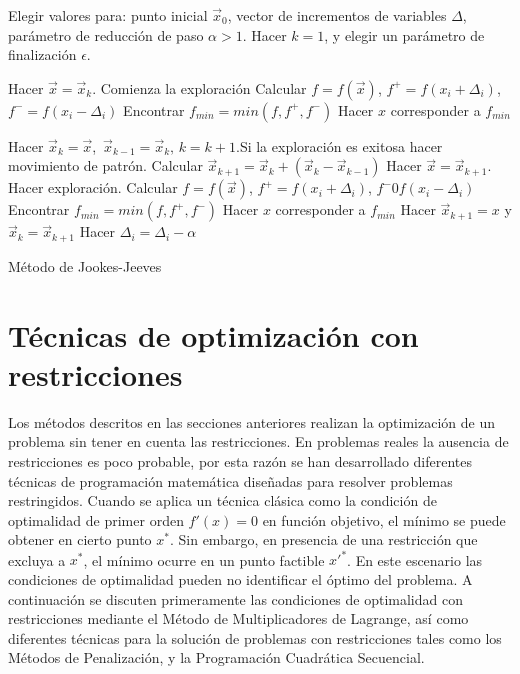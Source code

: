 \begin{algorithm}
	\begin{algorithmic}[1]
		\STATE Elegir valores para: punto inicial $\vec{x}_0$, vector de incrementos de variables $\Delta$, parámetro de reducción de paso   $\alpha>1$. Hacer $k=1$, y elegir un parámetro de finalización $\epsilon$. 
        
		\WHILE {$  \epsilon <|| \Delta||$}
		\STATE Hacer $\vec{x}=\vec{x}_k$. Comienza la exploración
         \STATE Calcular $f=f(\vec{x})$, $f^+=f(x_i+ \Delta_i)$, $f^- =f(x_i- \Delta_i)$
         \STATE Encontrar $f_{min}= min(f,f^+,f^-)$
         \STATE Hacer $x$ corresponder a $f_{min}$
          \ENDFOR
          
          \STATE Hacer $\vec{x}_k=\vec{x}$,\, $\vec{x}_{k-1}=\vec{x}_k,\, k=k+1 $.Si la exploración es exitosa hacer movimiento de patrón.
          \STATE Calcular $\vec{x}_{k+1}=\vec{x}_{k}+(\vec{x}_{k}-\vec{x}_{k-1})$
           \STATE Hacer $\vec{x}=\vec{x}_{k+1}$. Hacer exploración.
            	 \STATE Calcular $f=f(\vec{x})$, $f^+=f(x_i+ \Delta_i)$, $f^-0f(x_i- \Delta_i)$
            	 \STATE Encontrar $f_{min}= min(f,f^+,f^-)$
            	 \STATE Hacer $x$ corresponder a $f_{min}$
             \ENDFOR
           \STATE Hacer $\vec{x}_{k+1}=x$ y $\vec{x}_{k}=\vec{x}_{k+1}$
          \ENDWHILE
          \ENDIF
            	 \STATE Hacer $ \Delta_i=\Delta_i-\alpha$
             \ENDFOR
		\ENDWHILE
	\end{algorithmic}
	\caption{Método de Jookes-Jeeves}\label{alg:Jookes-Jeeves}
\end{algorithm}
\section{Técnicas de optimización con restricciones}
Los métodos descritos en las secciones anteriores realizan la optimización de un problema sin tener en cuenta las restricciones. En problemas reales la ausencia de restricciones es poco probable, por esta razón se han desarrollado diferentes técnicas de programación matemática diseñadas para resolver problemas restringidos. Cuando se aplica un técnica clásica como la condición de optimalidad de primer orden $f'(x)=0$ en función objetivo, el mínimo se puede obtener en cierto punto $x^*$. Sin embargo, en presencia de una restricción que excluya a $x^*$, el mínimo ocurre en un punto factible ${x'}^*$. En este escenario las condiciones de optimalidad pueden no identificar el óptimo del problema. A continuación se discuten primeramente las condiciones de optimalidad con restricciones mediante el Método de Multiplicadores de Lagrange, así como diferentes técnicas para la solución de problemas con restricciones tales como los Métodos de Penalización, y la Programación Cuadrática Secuencial.

